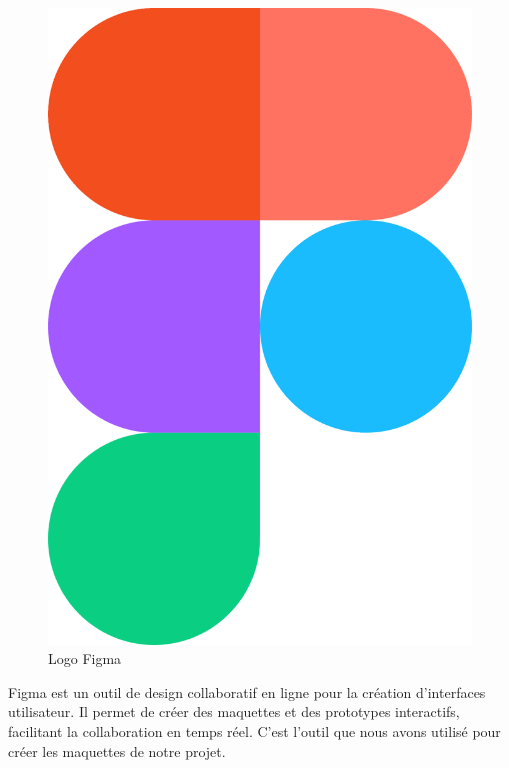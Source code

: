 \begin{figure}[htbp]
   \centering
   \includegraphics[scale=0.03]{Images/figma.png} 
   \caption{Logo Figma}
   \label{fig:figma}
\end{figure}
Figma est un outil de design collaboratif en ligne pour la 
création d'interfaces utilisateur. Il permet de créer des 
maquettes et des prototypes interactifs, facilitant la 
collaboration en temps réel\cite{figma}. C'est l'outil que nous avons utilisé 
pour créer les maquettes de notre projet.
\newline

